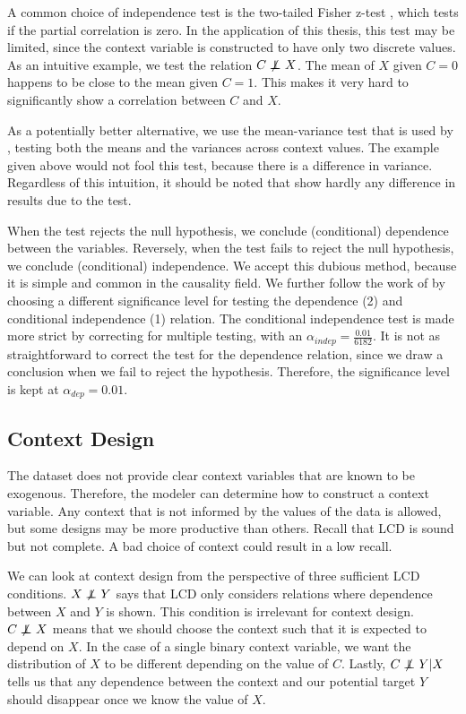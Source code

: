 A common choice of independence test is the two-tailed Fisher z-test \citep{fisher1924distribution}, which tests if the partial correlation is zero. In the application of this thesis, this test may be limited, since the context variable is constructed to have only two discrete values. As an intuitive example, we test the relation $C\operatorname*{{\,\not\mkern-1mu\perp\mkern-12mu\perp\,}} X$. The mean of $X$ given $C=0$ happens to be close to the mean given $C=1$. This makes it very hard to significantly show a correlation between $C$ and $X$. 

As a potentially better alternative, we use the mean-variance test that is used by \citet{versteeg2019boosting}, testing both the means and the variances across context values. The example given above would not fool this test, because there is a difference in variance. Regardless of this intuition, it should be noted that \citet{versteeg2019boosting} show hardly any difference in results due to the test.

When the test rejects the null hypothesis, we conclude (conditional) dependence between the variables. Reversely, when the test fails to reject the null hypothesis, we conclude (conditional) independence. We accept this dubious method, because it is simple and common in the causality field. We further follow the work of \citet{versteeg2019boosting} by choosing a different significance level for testing the dependence (2) and conditional independence (1) relation. The conditional independence test is made more strict by correcting for multiple testing, with an $\alpha_{indep}=\frac{0.01}{6182}$. It is not as straightforward to correct the test for the dependence relation, since we draw a conclusion when we fail to reject the hypothesis. Therefore, the significance level is kept at $\alpha_{dep}=0.01$.


\subsection{Context Design}

The \citet{kemmeren2014large} dataset does not provide clear context variables that are known to be exogenous. Therefore, the modeler can determine how to construct a context variable. Any context that is not informed by the values of the data is allowed, but some designs may be more productive than others. Recall that LCD is sound but not complete. A bad choice of context could result in a low recall. 

We can look at context design from the perspective of three sufficient LCD conditions. $X\operatorname*{{\,\not\mkern-1mu\perp\mkern-12mu\perp\,}} Y$ says that LCD only considers relations where dependence between $X$ and $Y$ is shown. This condition is irrelevant for context design. $C\operatorname*{{\,\not\mkern-1mu\perp\mkern-12mu\perp\,}} X$ means that we should choose the context such that it is expected to depend on $X$. In the case of a single binary context variable, we want the distribution of $X$ to be different depending on the value of $C$. Lastly, $C\operatorname*{{\,\not\mkern-1mu\perp\mkern-12mu\perp\,}} Y|X$ tells us that any dependence between the context and our potential target $Y$ should disappear once we know the value of $X$. 

